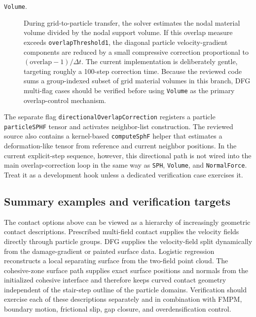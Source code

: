 \begin{description}
  \item[\texttt{Volume}.] During grid-to-particle transfer, the solver estimates the nodal material volume divided by the nodal support volume.  If this overlap measure exceeds \texttt{overlapThreshold1}, the diagonal particle velocity-gradient components are reduced by a small compressive correction proportional to $(\mathrm{overlap}-1)/\Delta t$.  The current implementation is deliberately gentle, targeting roughly a 100-step correction time.  Because the reviewed code sums a group-indexed subset of grid material volumes in this branch, DFG multi-flag cases should be verified before using \texttt{Volume} as the primary overlap-control mechanism.
\end{description}

The separate flag \texttt{directionalOverlapCorrection} registers a particle \texttt{particleSPHF} tensor and activates neighbor-list construction.  The reviewed source also contains a kernel-based \texttt{computeSphF} helper that estimates a deformation-like tensor from reference and current neighbor positions.  In the current explicit-step sequence, however, this directional path is not wired into the main overlap-correction loop in the same way as \texttt{SPH}, \texttt{Volume}, and \texttt{NormalForce}.  Treat it as a development hook unless a dedicated verification case exercises it.


\subsection{Summary examples and verification targets}
\label{subsec:contact-summary-examples}

The contact options above can be viewed as a hierarchy of increasingly geometric contact descriptions.  Prescribed multi-field contact supplies the velocity fields directly through particle groups.  DFG supplies the velocity-field split dynamically from the damage-gradient or painted surface data.  Logistic regression reconstructs a local separating surface from the two-field point cloud.  The cohesive-zone surface path supplies exact surface positions and normals from the initialized cohesive interface and therefore keeps curved contact geometry independent of the stair-step outline of the particle domains.  Verification should exercise each of these descriptions separately and in combination with FMPM, boundary motion, frictional slip, gap closure, and overdensification control.


